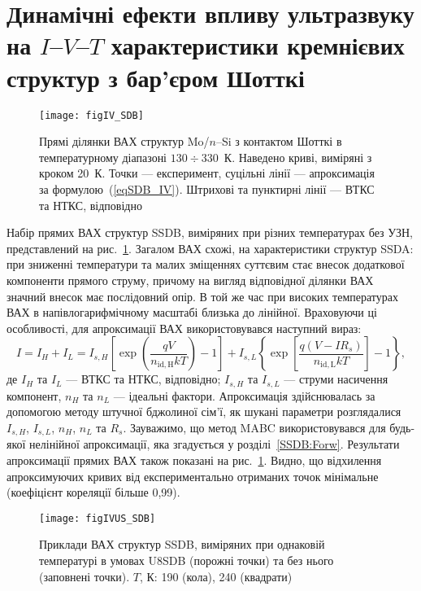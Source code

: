 \section{Динамічні ефекти впливу ультразвуку на $I$--$V$--$T$ характеристики кремнієвих структур з бар'єром Шотткі\label{SSDB:Forw}}

\begin{figure}[b]
\center
\texttt{[image: figIV\_SDB]}
\caption{\label{figIV_SDB}
Прямі  ділянки ВАХ структур Mo/$n$--Si з контактом Шотткі в температурному діапазоні $130\div330$~К.
Наведено криві, виміряні з кроком 20~К.
Точки --- експеримент,
суцільні лінії --- апроксимація за формулою~(\ref{eqSDB_IV}).
Штрихові та пунктирні лінії --- ВТКС та НТКС, відповідно
}%
\end{figure}


Набір прямих ВАХ структур  SSDB, виміряних при різних температурах без УЗН, представлений на рис.~\ref{figIV_SDB}.
Загалом ВАХ схожі, на характеристики структур SSDA:
при зниженні температури та малих зміщеннях суттєвим стає внесок додаткової компоненти прямого струму, причому
на вигляд відповідної ділянки ВАХ значний внесок має послідовний опір.
В той же час при високих температурах ВАХ в напівлогарифмічному масштабі близька до лінійної.
Враховуючи ці особливості, для апроксимації ВАХ використовувався наступний вираз:
\begin{equation}
\label{eqSDB_IV}
  I=I_H+I_L=I_{s,H}\left[\exp\left(\frac{qV}{n_\mathrm{id,H}kT}\right)-1\right]+
 I_{s,L}\left\{\exp\left[\frac{q(V-IR_s)}{n_\mathrm{id,L}kT}\right]-1\right\},
\end{equation}
де
$I_H$ та $I_L$ --- ВТКС та НТКС, відповідно;
$I_{s,H}$ та $I_{s,L}$ --- струми насичення компонент,
$n_{H}$ та $n_{L}$ --- ідеальні фактори.
Апроксимація здійснювалась за допомогою методу штучної бджолиної сім'ї,
як шукані параметри розглядалися $I_{s,H}$, $I_{s,L}$, $n_{H}$, $n_{L}$ та $R_s$.
Зауважимо, що метод MABC використовувався для будь-якої нелінійної апроксимації, яка згадується у розділі~\ref{SSDB:Forw}.
Результати апроксимації прямих ВАХ також показані на рис.~\ref{figIV_SDB}.
Видно, що відхилення апроксимуючих кривих від експериментально отриманих точок мінімальне
(коефіцієнт кореляції більше 0,99).

\begin{figure}
\center
\texttt{[image: figIVUS\_SDB]}
\caption{\label{figIVUS_SDB}
Приклади ВАХ структур SSDB, виміряних при однаковій температурі в умовах U8SDB (порожні точки) та без нього (заповнені точки).
$T$, К: 190 (кола), 240 (квадрати)
}%
\end{figure}

